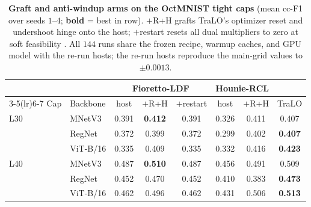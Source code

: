 \begin{table}[t]\centering
{\small
\setlength{\tabcolsep}{2.6pt}
\begin{tabular}{ll cc c cc c}
\toprule
 & & \multicolumn{3}{c}{Fioretto-LDF} & \multicolumn{2}{c}{Hounie-RCL} & \\
\cmidrule(lr){3-5}\cmidrule(lr){6-7}
Cap & Backbone & host & $+$R{+}H & $+$restart & host & $+$R{+}H & TraLO \\
\midrule
L30 & MNetV3 & 0.391 & \textbf{0.412} & 0.391 & 0.326 & 0.411 & 0.407 \\
 & RegNet & 0.372 & 0.399 & 0.372 & 0.299 & 0.402 & \textbf{0.407} \\
 & ViT-B/16 & 0.335 & 0.409 & 0.335 & 0.332 & 0.416 & \textbf{0.423} \\
\midrule
L40 & MNetV3 & 0.487 & \textbf{0.510} & 0.487 & 0.456 & 0.491 & 0.509 \\
 & RegNet & 0.452 & 0.470 & 0.452 & 0.410 & 0.383 & \textbf{0.473} \\
 & ViT-B/16 & 0.462 & 0.496 & 0.462 & 0.431 & 0.506 & \textbf{0.513} \\
\bottomrule
\end{tabular}}
\caption{\textbf{Graft and anti-windup arms on the OctMNIST tight caps}
(mean cc-F1 over seeds $1$--$4$; \textbf{bold} = best in row). $+$R{+}H grafts
TraLO's optimizer reset and undershoot hinge onto the host; $+$restart resets
all dual multipliers to zero at soft feasibility \citep{gallego2022controlled}.
All $144$ runs share the frozen recipe, warmup caches, and GPU model with the
re-run hosts; the re-run hosts reproduce the main-grid values to $\pm 0.0013$.}
\label{tab:graft}
\end{table}
